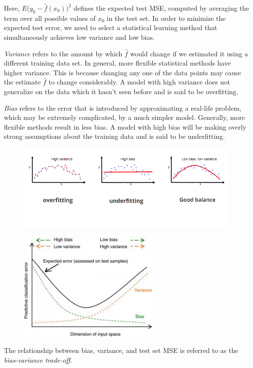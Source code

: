 \documentclass{article}
\numberwithin{equation}{section}
\begin{document}
Here, $E \Big (y_0 - \hat f(x_0) \Big )^2$ defines the expected test MSE, computed by averaging the term over all possible values of $x_0$ in the test set. In order to minimize the expected test error, we need to select a statistical learning method that simultaneously achieves low variance and low bias. 

\textit{Variance} refers to the amount by which $\hat f$ would change if we estimated it using a different training data set. In general, more flexible statistical methods have higher variance. This is because changing any one of the data points may cause the estimate $\hat f$ to change considerably. A model with high variance does not generalize on the data which it hasn't seen before and is said to be overfitting.

\textit{Bias} refers to the error that is introduced by approximating a real-life problem, which may be extremely complicated, by a much simpler model. Generally, more flexible methods result in less bias. A model with high bias will be making overly strong assumptions about the training data and is said to be underfitting. 

\begin{figure}[h]
    \centering
    \includegraphics[width=13cm]{bias-variance-tradeoff.png}
\end{figure}
\vspace{-1cm} \begin{figure}[h]
    \centering
    \includegraphics[width=7cm]{bias-variance-tuning.jpg}
\end{figure}
The relationship between bias, variance, and test set MSE is referred to as the \textit{bias-variance trade-off}. 
\end{document}
